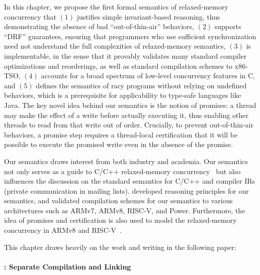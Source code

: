 In this chapter, we propose the first formal semantics of relaxed-memory concurrency that $(1)$
justifies simple invariant-based reasoning, thus demonstrating the absence of bad
``out-of-thin-air'' behaviors, $(2)$ supports ``DRF'' guarantees, ensuring that programmers who use
sufficient synchronization need not understand the full complexities of relaxed-memory semantics,
$(3)$ is implementable, in the sense that it provably validates many standard compiler optimizations
and reorderings, as well as standard compilation schemes to x86-TSO, $(4)$ accounts for a broad
spectrum of low-level concurrency features in C, and $(5)$ defines the semantics of racy programs
without relying on undefined behaviors, which is a prerequisite for applicability to type-safe
languages like Java.  The key novel idea behind our semantics is the notion of promises: a thread
may make the effect of a write before actually executing it, thus enabling other threads to read
from that write out of order.  Crucially, to prevent out-of-thin-air behaviors, a promise step
requires a thread-local certification that it will be possible to execute the promised write even in
the absence of the promise.

Our semantics draws interest from both industry and academia.  Our semantics not only serves as a
guide to C/C++ relaxed-memory concurrency~\cite{blog,niko} but also influences the discussion on the
standard semantics for C/C++ and compiler IRs (private communication in mailing lists).
\cite{viktor-logic} developed reasoning principles for our semantics, and \cite{viktor-compilation}
validated compilation schemes for our semantics to various architectures such as ARMv7, ARMv8,
RISC-V, and Power.  Furthermore, the idea of promises and certification is also used to model the
relaxed-memory concurrency in ARMv8 and RISC-V~\cite{promising-armv8-riscv}.

This chapter draws heavily on the work and writing in the following paper:



\paragraph{: Separate Compilation and Linking}

